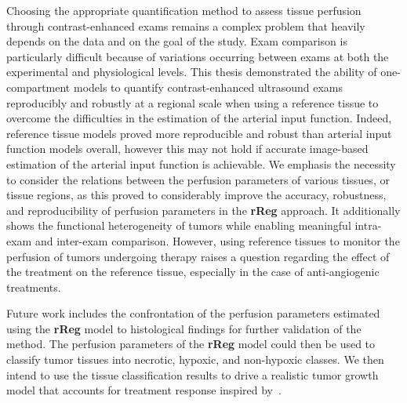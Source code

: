 Choosing the appropriate quantification method to assess tissue perfusion through contrast-enhanced exams remains a complex problem that heavily depends on the data and on the goal of the study.
Exam comparison is particularly difficult because of variations occurring between exams at both the experimental and physiological levels.
This thesis demonstrated the ability of one-compartment models to quantify contrast-enhanced ultrasound exams reproducibly and robustly at a regional scale when using a reference tissue to overcome the difficulties in the estimation of the arterial input function.
Indeed, reference tissue models proved more reproducible and robust than arterial input function models overall, however this may not hold if accurate image-based estimation of the arterial input function is achievable. 
We emphasis the necessity to consider the relations between the perfusion parameters of various tissues, or tissue regions, as this proved to considerably improve the accuracy, robustness, and reproducibility of perfusion parameters in the \textbf{rReg} approach.
It additionally shows the functional heterogeneity of tumors while enabling meaningful intra-exam and inter-exam comparison.
However, using reference tissues to monitor the perfusion of tumors undergoing therapy raises a question regarding the effect of the treatment on the reference tissue, especially in the case of anti-angiogenic treatments.

Future work includes the confrontation of the perfusion parameters estimated using the \textbf{rReg} model to histological findings for further validation of the method.
The perfusion parameters of the \textbf{rReg} model could then be used to classify tumor tissues into necrotic, hypoxic, and non-hypoxic classes.
We then intend to use the tissue classification results to drive a realistic tumor growth model that accounts for treatment response inspired by~\citet{Ribba:2011cl}.

\newpage


